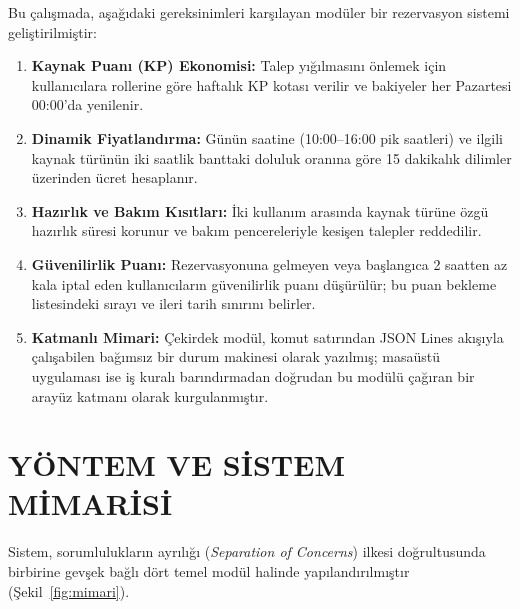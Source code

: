 \documentclass[conference]{IEEEtran}
\begin{document}
Bu çalışmada, aşağıdaki gereksinimleri karşılayan modüler bir rezervasyon sistemi geliştirilmiştir:
\begin{enumerate}
    \item \textbf{Kaynak Puanı (KP) Ekonomisi:} Talep yığılmasını önlemek için kullanıcılara rollerine göre haftalık KP kotası verilir ve bakiyeler her Pazartesi 00:00'da yenilenir.
    \item \textbf{Dinamik Fiyatlandırma:} Günün saatine (10:00--16:00 pik saatleri) ve ilgili kaynak türünün iki saatlik banttaki doluluk oranına göre 15 dakikalık dilimler üzerinden ücret hesaplanır.
    \item \textbf{Hazırlık ve Bakım Kısıtları:} İki kullanım arasında kaynak türüne özgü hazırlık süresi korunur ve bakım pencereleriyle kesişen talepler reddedilir.
    \item \textbf{Güvenilirlik Puanı:} Rezervasyonuna gelmeyen veya başlangıca 2 saatten az kala iptal eden kullanıcıların güvenilirlik puanı düşürülür; bu puan bekleme listesindeki sırayı ve ileri tarih sınırını belirler.
    \item \textbf{Katmanlı Mimari:} Çekirdek modül, komut satırından JSON Lines akışıyla çalışabilen bağımsız bir durum makinesi olarak yazılmış; masaüstü uygulaması ise iş kuralı barındırmadan doğrudan bu modülü çağıran bir arayüz katmanı olarak kurgulanmıştır.
\end{enumerate}

\section{YÖNTEM VE SİSTEM MİMARİSİ}
Sistem, sorumlulukların ayrılığı (\textit{Separation of Concerns}) ilkesi doğrultusunda birbirine gevşek bağlı dört temel modül halinde yapılandırılmıştır (Şekil~\ref{fig:mimari}).
\end{document}
